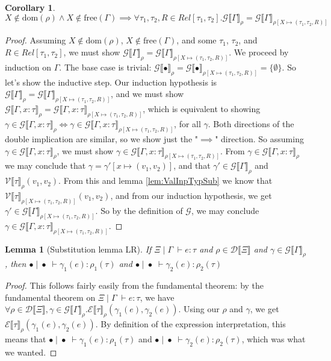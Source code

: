 \documentclass[twoside,11pt,openright]{report}
\newtheorem{corollary}{Corollary}[theorem]
\newtheorem{lemma}[theorem]{Lemma}
\theoremstyle{definition}
\newcommand{\var}{x}
\newcommand{\expr}{e}
\newcommand{\val}{v}
\newcommand{\Tvar}{X}
\newcommand{\typ}{\tau}
\newcommand{\venv}{\Gamma}
\newcommand{\tenv}{\Xi}
\newcommand{\emptenv}{\bullet}
\newcommand{\empvenv}{\bullet}
\newcommand{\jdg}[4]{#1 \; | \; #2 \; \vdash #3 : #4}
\newcommand{\ValInp}[2]{\mathcal{V} \llbracket #1 \rrbracket_{#2}}
\newcommand{\ExpInp}[2]{\mathcal{E} \llbracket #1 \rrbracket_{#2}}
\newcommand{\VenvInp}[2]{\mathcal{G} \llbracket #1 \rrbracket_{#2}}
\newcommand{\TenvInp}[1]{\mathcal{D} \llbracket #1 \rrbracket}
\newcommand{\map}[2]{#1 \mapsto #2}
\begin{document}
\begin{corollary}\label{cor:VenvInp}
  $\Tvar \notin \mathrm{dom}(\rho) \land \Tvar \notin \mathrm{free}(\venv) \implies \forall \typ_1, \typ_2, R \in Rel[\typ_1, \typ_2] . \VenvInp{\venv}{\rho} = \VenvInp{\venv}{\rho[\map{\Tvar}{(\typ_1, \typ_2, R)}]}$
\end{corollary}
\begin{proof}
  Assuming $\Tvar \notin \mathrm{dom}(\rho)$, $\Tvar \notin \mathrm{free}(\venv)$, and some $\typ_1$, $\typ_2$, and $R \in Rel[\typ_1, \typ_2]$, we must show $\VenvInp{\venv}{\rho} = \VenvInp{\venv}{\rho[\map{\Tvar}{(\typ_1, \typ_2, R)}]}$. We proceed by induction on $\venv$. The base case is trivial: $\VenvInp{\empvenv}{\rho} = \VenvInp{\empvenv}{\rho[\map{\Tvar}{(\typ_1, \typ_2, R)}]} = \{\emptyset\}$. So let's show the inductive step. Our induction hypothesis is $\VenvInp{\venv}{\rho} = \VenvInp{\venv}{\rho[\map{\Tvar}{(\typ_1, \typ_2, R)}]}$, and we must show $\VenvInp{\venv, \var : \typ}{\rho} = \VenvInp{\venv, \var : \typ}{\rho[\map{\Tvar}{(\typ_1, \typ_2, R)}]}$, which is equivalent to showing $\gamma \in \VenvInp{\venv, \var : \typ}{\rho} \iff \gamma \in \VenvInp{\venv, \var : \typ}{\rho[\map{\Tvar}{(\typ_1, \typ_2, R)}]}$, for all $\gamma$. Both directions of the double implication are similar, so we show just the "$\implies$" direction. So assuming $\gamma \in \VenvInp{\venv, \var : \typ}{\rho}$, we must show $\gamma \in \VenvInp{\venv, \var : \typ}{\rho[\map{\Tvar}{(\typ_1, \typ_2, R)}]}$. From $\gamma \in \VenvInp{\venv, \var : \typ}{\rho}$ we may conclude that $\gamma = \gamma'[\map{\var}{(\val_1, \val_2)}]$, and that $\gamma' \in \VenvInp{\venv}{\rho}$ and $\ValInp{\typ}{\rho}(\val_1, \val_2)$. From this and lemma \ref{lem:ValInpTypSub} we know that $\ValInp{\typ}{\rho[\map{\Tvar}{(\typ_1, \typ_2, R)}]}(\val_1, \val_2)$, and from our induction hypothesis, we get $\gamma' \in \VenvInp{\venv}{\rho[\map{\Tvar}{(\typ_1, \typ_2, R)}]}$. So by the definition of $\mathcal{G}$, we may conclude $\gamma \in \VenvInp{\venv, \var : \typ}{\rho[\map{\Tvar}{(\typ_1, \typ_2, R)}]}$.
\end{proof}

\begin{lemma}[Substitution lemma LR]\label{lem:subst_LR}
  If $\jdg{\tenv}{\venv}{\expr}{\typ}$ and $\rho \in \TenvInp{\tenv}$ and $\gamma \in \VenvInp{\venv}{\rho}$, then $\jdg{\emptenv}{\empvenv}{\gamma_1(\expr)}{\rho_1(\typ)}$ and $\jdg{\emptenv}{\empvenv}{\gamma_2(\expr)}{\rho_2(\typ)}$
\end{lemma}
\begin{proof}
  This follows fairly easily from the fundamental theorem: by the fundamental theorem on $\jdg{\tenv}{\venv}{\expr}{\typ}$, we have $\forall \rho \in \TenvInp{\tenv}, \gamma \in \VenvInp{\venv}{\rho} . 
  \ExpInp{\typ}{\rho}(\gamma_1(\expr), \gamma_2(\expr))$. Using our $\rho$ and $\gamma$, we get $\ExpInp{\typ}{\rho}(\gamma_1(\expr), \gamma_2(\expr))$. By definition of the expression interpretation, this means that $\jdg{\emptenv}{\empvenv}{\gamma_1(\expr)}{\rho_1(\typ)}$ and $\jdg{\emptenv}{\empvenv}{\gamma_2(\expr)}{\rho_2(\typ)}$, which was what we wanted.
\end{proof}
\end{document}
